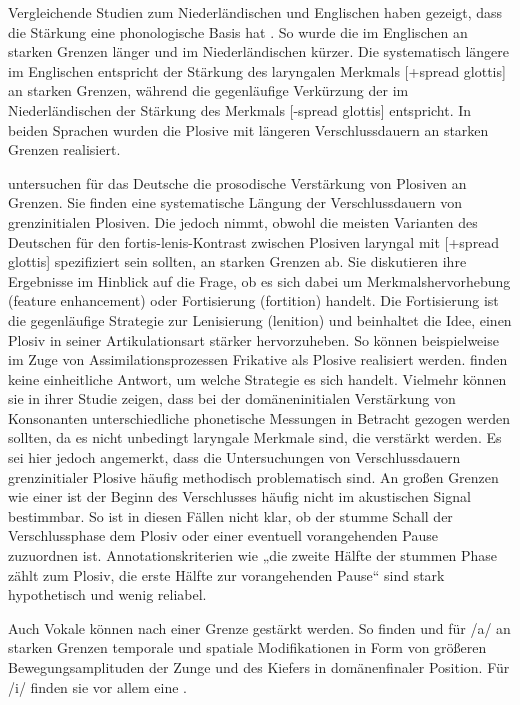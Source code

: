 Vergleichende Studien zum Niederländischen und Englischen haben gezeigt, dass die Stärkung eine phonologische Basis hat \citep{Cho2005b}. So wurde die  im Englischen an starken Grenzen länger und im Niederländischen kürzer. Die systematisch längere  im Englischen entspricht der Stärkung des laryngalen Merkmals [+spread glottis] an  starken Grenzen, während die gegenläufige Verkürzung der  im Niederländischen der Stärkung des Merkmals [-spread glottis] entspricht. In beiden Sprachen wurden die Plosive mit längeren Verschlussdauern an  starken Grenzen realisiert.

\citet{Kuzla2007} untersuchen für das Deutsche die prosodische Verstärkung von Plosiven an Grenzen. Sie finden eine systematische Längung der Verschlussdauern von grenzinitialen Plosiven. Die  jedoch nimmt, obwohl die meisten Varianten des Deutschen für den fortis-lenis-Kontrast zwischen Plosiven laryngal mit [+spread glottis] spezifiziert sein sollten, an starken Grenzen ab. Sie diskutieren ihre Ergebnisse im Hinblick auf die Frage, ob es sich dabei um Merkmalshervorhebung (feature enhancement) oder Fortisierung (fortition) handelt. Die Fortisierung ist die gegenläufige Strategie zur Lenisierung (lenition) und beinhaltet die Idee, einen Plosiv in seiner Artikulationsart stärker hervorzuheben. So können beispielweise im Zuge von Assimilationsprozessen Frikative als Plosive realisiert werden. \citet{Kuzla2007} finden keine einheitliche Antwort, um welche Strategie es sich handelt. Vielmehr können sie in ihrer Studie zeigen, dass bei der domäneninitialen Verstärkung von Konsonanten unterschiedliche phonetische Messungen in Betracht gezogen werden sollten, da es nicht unbedingt laryngale Merkmale sind, die  verstärkt werden. Es sei hier jedoch angemerkt, dass die Untersuchungen von Verschlussdauern grenzinitialer Plosive häufig methodisch problematisch sind. An großen Grenzen wie einer  ist der Beginn des Verschlusses häufig nicht im akustischen Signal bestimmbar. So ist in diesen Fällen nicht klar, ob der stumme Schall der Verschlussphase dem Plosiv oder einer eventuell vorangehenden Pause zuzuordnen ist. Annotationskriterien wie „die zweite Hälfte der stummen Phase zählt zum Plosiv, die erste Hälfte zur vorangehenden Pause“ sind stark hypothetisch und wenig reliabel.

Auch Vokale können nach einer Grenze  gestärkt werden. So finden \citet{Tabain2003a} und \citet{Tabain2003b} für /a/ an  starken Grenzen temporale und spatiale Modifikationen in Form von größeren Bewegungsamplituden der Zunge und des Kiefers in domänenfinaler Position. Für /i/ finden sie vor allem eine .

